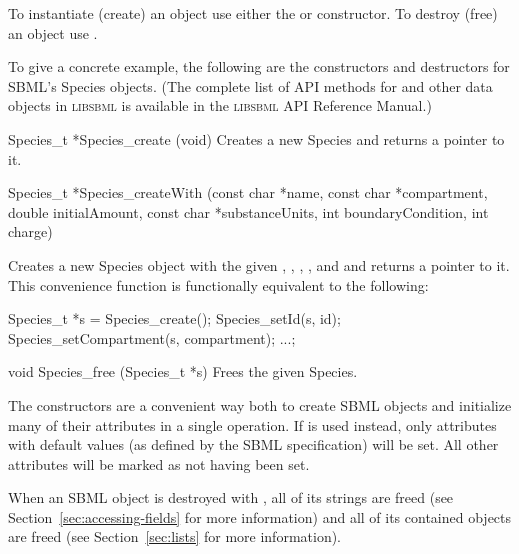 \documentclass{sbmlmanual}
\newcommand{\libsbml}{\textsc{libsbml}}
\begin{document}
To instantiate (create) an object use either the
 or  constructor.  To
destroy (free) an object use .

To give a concrete example, the following are the constructors and
destructors for SBML's Species objects.  (The complete list of API methods
for  and other data objects in \libsbml{} is available in
the \libsbml{} API Reference Manual.)


\begin{methoddef}{Species\_t *Species\_create (void)}
  Creates a new Species and returns a pointer to it.
\end{methoddef}

\begin{methoddef}{Species\_t *Species\_createWith (const char *name,
    const char *compartment,\\ double initialAmount, const char *substanceUnits,
    int boundaryCondition, int charge)}
  
  Creates a new Species object with the given ,
  , ,
  ,  and
   and returns a pointer to it.  This convenience function
  is functionally equivalent to the following:
  \begin{example}[c]
Species_t *s = Species_create();
Species_setId(s, id); Species_setCompartment(s, compartment); ...;
  \end{example}
\end{methoddef}

\begin{methoddef}{void Species\_free (Species\_t *s)}
  Frees the given Species.
\end{methoddef}


The  constructors are a convenient way both to
create SBML objects and initialize many of their attributes in a single
operation.  If  is used instead, only attributes with
default values (as defined by the SBML specification) will be set.  All
other attributes will be marked as not having been set.

When an SBML object is destroyed with , all of its
strings are freed (see Section~\ref{sec:accessing-fields} for more
information) and all of its contained objects are freed (see
Section~\ref{sec:lists} for more information).


\end{document}
